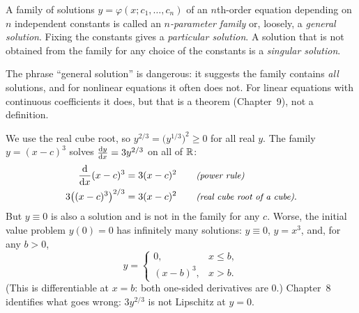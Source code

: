 \begin{definition}\label{def:ch01-general}
A family of solutions $y = \varphi(x; c_1,\dots,c_n)$ of an $n$th-order
equation depending on $n$ independent constants is called an \emph{$n$-parameter
family} or, loosely, a \emph{general solution}. Fixing the constants gives a
\emph{particular solution}. A solution that is not obtained from the family
for any choice of the constants is a \emph{singular solution}.
\end{definition}

The phrase ``general solution'' is dangerous: it suggests the family contains
\emph{all} solutions, and for nonlinear equations it often does not. For linear
equations with continuous coefficients it does, but that is a theorem
(Chapter~9), not a definition.

\begin{example}\label{ex:ch01-cube}
We use the real cube root, so $y^{2/3} = \bigl(y^{1/3}\bigr)^2 \ge 0$ for all
real $y$. The family $y = (x - c)^3$ solves $\frac{\mathrm{d}y}{\mathrm{d}x} = 3y^{2/3}$ on all of
$\mathbb{R}$:
\begin{align*}
  \frac{\mathrm{d}}{\mathrm{d}x}(x-c)^3 &= 3(x-c)^2 \qquad\text{\small\itshape(power rule)}\\
  3\bigl((x-c)^3\bigr)^{2/3} &= 3(x-c)^2 \qquad\text{\small\itshape(real cube root of a cube)}.
\end{align*}
But $y\equiv 0$ is also a solution and is not in the family for any $c$. Worse,
the initial value problem $y(0) = 0$ has infinitely many solutions: $y\equiv 0$,
$y = x^3$, and, for any $b>0$,
\[
  y = \begin{cases} 0, & x\le b,\\ (x-b)^3, & x> b.\end{cases}
\]
(This is differentiable at $x = b$: both one-sided derivatives are $0$.)
Chapter~8 identifies what goes wrong: $3y^{2/3}$ is not Lipschitz at $y=0$.
\end{example}

